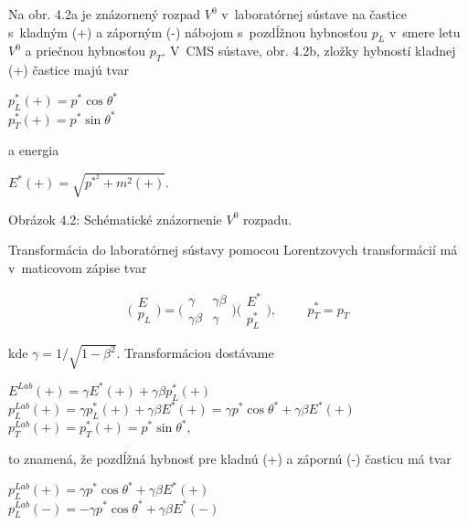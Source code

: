 Na obr. 4.2a je znázornený rozpad $V^{0}$ v~laboratórnej sústave na častice 
s~kladným (+) a záporným (-)  nábojom s~pozdĺžnou hybnosťou  $p_{L}$ v~smere
letu $V^{0}$ a priečnou hybnosťou $p_{T}$. V~CMS sústave, obr. 4.2b,  zložky
hybností kladnej (+) častice majú tvar
\begin{center}
  $ p_{L}^{*}(+)=p^{*}\cos\theta^{*}$ \\  
  $ p_{T}^{*}(+)=p^{*}\sin\theta^{*}$
\end{center}
a energia 
\begin{center}
  $ E^{*}(+)=\sqrt{p^{{*}^{2}} + m^{2}(+)}$.
\end{center}

\newpage
\begin{center}

\end{center}
\vspace{-6cm}
\begin{center}
  Obrázok 4.2: Schématické znázornenie $V^{0}$ rozpadu.
\end{center}
Transformácia do laboratórnej sústavy pomocou Lorentzovych transformácií má
v~maticovom zápise  tvar
\begin{center}
  $$ \Biggl( \begin{array}{c}
     E \\
     p_{L} \end{array} \Biggr) = \Biggl( \begin{array}{cc} \gamma &
\gamma\beta \\ \gamma\beta & \gamma \end{array} \Biggr) \Biggl(
\begin{array}{c} E^{*} \\ p_{L}^{*} \end{array} \Biggr), \hspace{1cm}
p_{T}^{*}= p_{T} $$
\end{center}
kde $\gamma=1/\sqrt{1-\beta^{2}}$. Transformáciou dostávame 
\begin{center}
  $E^{Lab}(+)=\gamma E^{*}(+) + \gamma\beta p_{L}^{*}(+)$ \\
  $p_{L}^{Lab}(+)=\gamma p_{L}^{*}(+) + \gamma\beta E^{*}(+) = \gamma
p^{*}\cos
  \theta^{*} + \gamma\beta E^{*}(+)$ \\
  $p_{T}^{Lab}(+)=p_{T}^{*}(+)= p^{*}\sin\theta^{*},$
\end{center}
to znamená, že pozdĺžná hybnosť pre kladnú (+) a zápornú (-) časticu má tvar
\begin{center}
  $p_{L}^{Lab}(+)= \gamma p^{*}\cos  \theta^{*} + \gamma\beta E^{*}(+)$ \\
  $p_{L}^{Lab}(-)= -\gamma p^{*}\cos  \theta^{*} + \gamma\beta E^{*}(-)$
\end{center}
